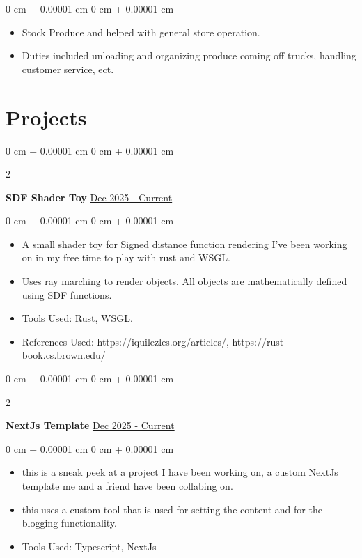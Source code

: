 \documentclass[10pt, letterpaper]{article}
\newenvironment{highlights}{
    \begin{itemize}[
        topsep=0.10 cm,
        parsep=0.10 cm,
        partopsep=0pt,
        itemsep=0pt,
        leftmargin=0 cm + 10pt
    ]
}{
    \end{itemize}
} %
\newenvironment{onecolentry}{
    \begin{adjustwidth}{
        0 cm + 0.00001 cm
    }{
        0 cm + 0.00001 cm
    }
}{
    \end{adjustwidth}
} %
\newenvironment{twocolentry}[2][]{
    \onecolentry
    \def\secondColumn{#2}
    \setcolumnwidth{\fill, 4.5 cm}
    \begin{paracol}{2}
}{
    \switchcolumn \raggedleft \secondColumn
    \end{paracol}
    \endonecolentry
} %
\begin{document}
        \vspace{0.10 cm}
        \begin{onecolentry}
            \begin{highlights}
                \item Stock Produce and helped with general store operation.
                \item Duties included unloading and organizing produce coming off trucks, handling customer service, ect.
            \end{highlights}
        \end{onecolentry}


    \section{Projects}

        \begin{twocolentry}{
            \href{https://gitlab.com/sp4aCemAn/rustrtxdoodle}{Dec 2025 - Current}
        }
            \textbf{SDF Shader Toy}\end{twocolentry}

        \vspace{0.10 cm}
        \begin{onecolentry}
          \begin{highlights}
          \item A small shader toy for Signed distance function rendering I've been working on in my free time to play with rust and WSGL. 
          \item Uses ray marching to render objects. All objects are mathematically defined using SDF functions.
          \item Tools Used: Rust, WSGL.  
          \item References Used: https://iquilezles.org/articles/, https://rust-book.cs.brown.edu/ 
          \end{highlights}
        \end{onecolentry}
        
        \begin{twocolentry}{
          \href{https://github.com/sp4aCemAn/nextjstemplatesite}{Dec 2025 - Current}
        }
        
       \textbf{NextJs Template}\end{twocolentry}

        \vspace{0.10 cm}
        \begin{onecolentry}
          \begin{highlights}
          \item this is a sneak peek at a project I have been working on, a custom NextJs template me and a friend have been collabing on. 
          \item this uses a custom tool that is used for setting the content and for the blogging functionality. 
          \item Tools Used: Typescript, NextJs
          \end{highlights}
        \end{onecolentry}
\end{document}
